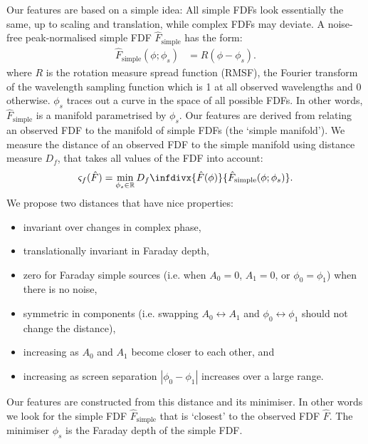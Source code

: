     Our features are based on a simple idea: All simple FDFs look essentially the same, up to scaling and translation, while complex FDFs may deviate. A noise-free peak-normalised simple FDF $\hat F_{\mathrm{simple}}$ has the form:
    \begin{align}
        \label{eq:faraday-f-simple}
        \hat F_{\mathrm{simple}}(\phi; \phi_s) &= R(\phi - \phi_s).
    \end{align}
    where $R$ is the rotation measure spread function (RMSF), the Fourier transform of the wavelength sampling function which is 1 at all observed wavelengths and 0 otherwise. $\phi_s$ traces out a curve in the space of all possible FDFs. In other words, $\hat F_{\mathrm{simple}}$ is a manifold parametrised by $\phi_s$. Our features are derived from relating an observed FDF to the manifold of simple FDFs (the `simple manifold'). We measure the distance of an observed FDF to the simple manifold using distance measure $D_f$, that takes all values of the FDF into account:
    \begin{equation}
        \label{eq:faraday-complexity-model}
        \varsigma_f(\hat F) = \min_{\phi_s \in \mathbb{R}} D_f\infdivx{\hat F(\phi)}{\hat F_{\mathrm{simple}}(\phi; \phi_s)}.
    \end{equation}
    We propose two distances that have nice properties:
    \begin{itemize}
        \item invariant over changes in complex phase,
        \item translationally invariant in Faraday depth,
        \item zero for Faraday simple sources (i.e. when $A_0 = 0$, $A_1 = 0$, or $\phi_0 = \phi_1$) when there is no noise,
        \item symmetric in components (i.e. swapping $A_0 \leftrightarrow A_1$ and $\phi_0 \leftrightarrow \phi_1$ should not change the distance),
        \item increasing as $A_0$ and $A_1$ become closer to each other, and
        \item increasing as screen separation $|\phi_0 - \phi_1|$ increases over a large range.
    \end{itemize}
    Our features are constructed from this distance and its minimiser. In other words
    we look for the simple FDF $\hat{F}_{\mathrm{simple}}$ that is `closest' to the observed FDF $\hat{F}$.
    The minimiser $\phi_s$ is the Faraday depth of the simple FDF.

